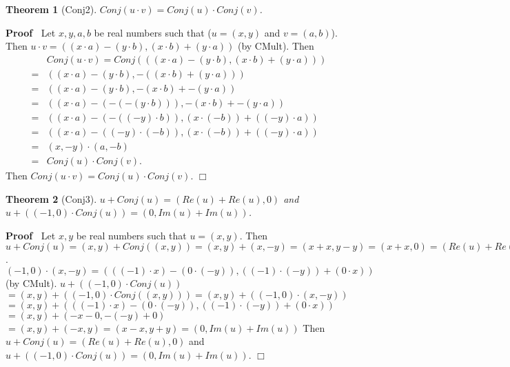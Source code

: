 \documentclass{article}
\newenvironment{forthel}{\begin{leftbar}}{\end{leftbar}}
\newenvironment{proof}{\noindent\textbf{Proof\ }}{\hspace*{\fill}$\Box$\medskip}
\newtheorem{theorem}{Theorem}
\newcommand{\cmul}{\cdot}
\newcommand{\cadd}{+}
\begin{document}
\begin{forthel}
\begin{theorem}[Conj2] $Conj(u \cmul v) = Conj(u)  \cmul  Conj(v)$.
\end{theorem}\begin{proof}
 	Let $x,y,a,b$ be real numbers such that ($u = (x,y)$ and $v = (a,b)$).\newline
Then $u  \cmul  v = ((x \cdot a)-(y \cdot b),(x \cdot b)+(y \cdot a))$ (by CMult).\newline
Then
\begin{align*}
&Conj(u  \cmul  v) 	= Conj(((x \cdot a)-(y \cdot b),(x \cdot b)+(y \cdot a))) \\
= &((x \cdot a) - (y \cdot b)       ,-((x \cdot b)+(y \cdot a))) \\
= &((x \cdot a) - (y \cdot b)       , -(x \cdot b)+ -(y \cdot a))\\
= &((x \cdot a) - (-(-(y \cdot b))) , -(x \cdot b)+ -(y \cdot a))\\
= &((x \cdot a) - ( -((-y) \cdot b) ) , (x \cdot (-b))+ ((-y) \cdot a))\\
= &((x \cdot a) - ((-y) \cdot (-b)) , (x \cdot (-b))+ ((-y) \cdot a))\\
= &(x,-y)  \cmul  (a,-b)\\
= &Conj(u)  \cmul  Conj(v). 
\end{align*}
Then $Conj(u \cmul v) = Conj(u)  \cmul  Conj(v)$.
\end{proof}


\begin{theorem}[Conj3] $u  \cadd  Conj(u) = (Re(u)+Re(u),0)$ and $u  \cadd  ((-1,0) \cmul Conj(u)) = (0,Im(u)+Im(u))$.
\end{theorem}\begin{proof}
 Let $x,y$ be real numbers such that $u=(x,y)$.\newline
Then $u  \cadd  Conj(u) = (x,y)  \cadd  Conj((x,y)) = (x,y)  \cadd  (x,-y) = (x+x,y-y) = (x+x,0) = (Re(u)+Re(u),0)$.\newline
$(-1,0) \cmul (x,-y) = ( ((-1) \cdot x) - (0 \cdot (-y)) , ((-1) \cdot (-y)) + (0 \cdot x))$ (by CMult).\newline
$u  \cadd  ((-1,0) \cmul Conj(u))$\newline$	
= (x,y)  \cadd  ((-1,0) \cmul Conj((x,y))) $\newline$
= (x,y)  \cadd  ((-1,0) \cmul (x,-y)) $\newline$
= (x,y)  \cadd  ( ((-1) \cdot x) - (0 \cdot (-y)) , ((-1) \cdot (-y)) + (0 \cdot x))$\newline$
= (x,y)  \cadd  (-x - 0, -(-y) + 0)$\newline$
= (x,y)  \cadd  (-x , y) = (x-x,y+y) = (0,Im(u)+Im(u))$ \newline
Then $u  \cadd  Conj(u) = (Re(u)+Re(u),0)$ and $u  \cadd  ((-1,0) \cmul Conj(u)) = (0,Im(u)+Im(u))$.
\end{proof}


\end{forthel}
\end{document}
